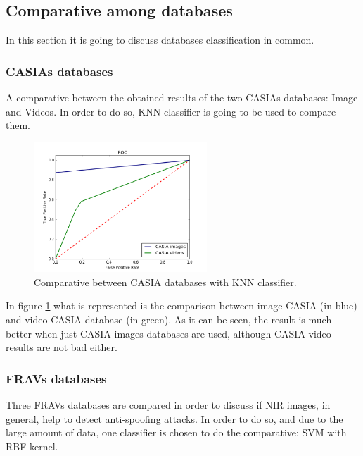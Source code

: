 \subsection{Comparative among databases}
In this section it is going to discuss databases classification in common.

\subsubsection{CASIAs databases}
A comparative between the obtained results of the two CASIAs databases: Image and Videos. In order to do so, KNN classifier is going to be used to compare them.\\

\begin{figure}[htb]
\centering
\includegraphics[width=0.58\textwidth]{images/comparative/CASIAs_KNN_ROC.png}
\caption{Comparative between CASIA databases with KNN classifier.} \label{fig:CASIAS_KNN_comparative}
\end{figure}

In figure \ref{fig:CASIAS_KNN_comparative} what is represented is the comparison between image CASIA (in blue) and video CASIA database (in green). As it can be seen, the result is much better when just CASIA images databases are used, although CASIA video results are not bad either.\\

\subsubsection{FRAVs databases}
Three FRAVs databases are compared in order to discuss if NIR images, in general, help to detect anti-spoofing attacks. In order to do so, and due to the large amount of data, one classifier is chosen to do the comparative: SVM with RBF kernel.\\

